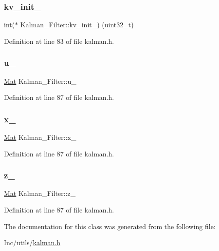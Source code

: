 \subsubsection{\texorpdfstring{kv\_init\_}{kv\_init\_}}
{\footnotesize\ttfamily int($\ast$ Kalman\+\_\+\+Filter\+::kv\+\_\+init\+\_\+) (uint32\+\_\+t)\hspace{0.3cm}{\ttfamily [private]}}



Definition at line 83 of file kalman.\+h.

\mbox{\label{class_kalman___filter_ae680b4ee331f43b1f2b7d44bed01c2d1}} 
\subsubsection{\texorpdfstring{u\_}{u\_}}
{\footnotesize\ttfamily \mbox{\hyperlink{class_mat}{Mat}} Kalman\+\_\+\+Filter\+::u\+\_\+\hspace{0.3cm}{\ttfamily [private]}}



Definition at line 87 of file kalman.\+h.

\mbox{\label{class_kalman___filter_a852bae6b48e7f39a957caf21696cae6c}} 
\subsubsection{\texorpdfstring{x\_}{x\_}}
{\footnotesize\ttfamily \mbox{\hyperlink{class_mat}{Mat}} Kalman\+\_\+\+Filter\+::x\+\_\+\hspace{0.3cm}{\ttfamily [private]}}



Definition at line 87 of file kalman.\+h.

\mbox{\label{class_kalman___filter_a8f8715405aefe7c03198dbef3ac28b0c}} 
\subsubsection{\texorpdfstring{z\_}{z\_}}
{\footnotesize\ttfamily \mbox{\hyperlink{class_mat}{Mat}} Kalman\+\_\+\+Filter\+::z\+\_\+\hspace{0.3cm}{\ttfamily [private]}}



Definition at line 87 of file kalman.\+h.



The documentation for this class was generated from the following file\+:\begin{DoxyCompactItemize}
\item 
Inc/utils/\mbox{\hyperlink{kalman_8h}{kalman.\+h}}\end{DoxyCompactItemize}
